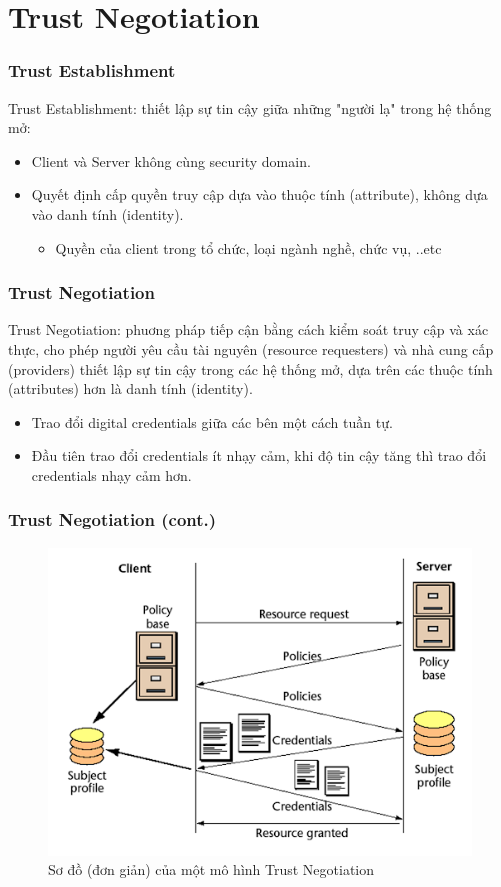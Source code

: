 \documentclass[11pt]{beamer}
\newcommand{\eg}{\text{e.g.\ }}
\begin{document}
\section{Trust Negotiation}
\begin{frame}
\frametitle{Trust Establishment}
Trust Establishment: thiết lập sự tin cậy giữa những "người lạ" trong hệ thống mở:
\begin{itemize}
\item Client và Server không cùng security domain.
\item Quyết định cấp quyền truy cập dựa vào thuộc tính (attribute), không dựa vào danh tính (identity).
\begin{itemize}
\item \eg Quyền của client trong tổ chức, loại ngành nghề, chức vụ, ..etc
\end{itemize}
\end{itemize}
\end{frame}

\begin{frame}
\frametitle{Trust Negotiation}
Trust Negotiation: phuơng pháp tiếp cận bằng cách kiểm soát truy cập và xác thực, cho phép người yêu cầu tài nguyên (resource requesters) và nhà cung cấp (providers) thiết lập sự tin cậy trong các hệ thống mở, dựa trên các thuộc tính (attributes) hơn là danh tính (identity).
\begin{itemize}
\item Trao đổi digital credentials giữa các bên một cách tuần tự.
\item Đầu tiên trao đổi credentials ít nhạy cảm, khi độ tin cậy tăng thì trao đổi credentials nhạy cảm hơn.
\end{itemize}
\end{frame}


\begin{frame}
\frametitle{Trust Negotiation (cont.)}
\begin{figure}[H]
\centering
\includegraphics[scale=.4]{img/trust-simple.png}
\caption{Sơ đồ (đơn giản) của một mô hình Trust Negotiation}
\end{figure}
\end{frame}
\end{document}
